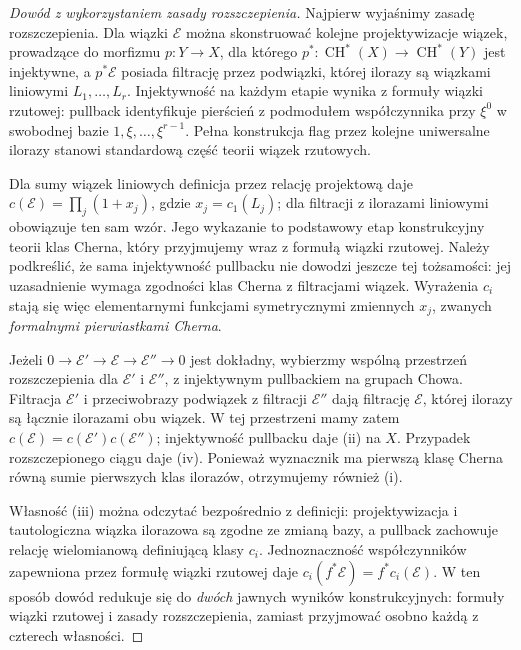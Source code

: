 \documentclass[11pt,a4paper,openany]{report}
\numberwithin{equation}{section}
\theoremstyle{plain}
\theoremstyle{definition}
\theoremstyle{remark}
\begin{document}
\begin{proof}[Dowód z wykorzystaniem zasady rozszczepienia]
Najpierw wyjaśnimy zasadę rozszczepienia. Dla wiązki
$\mathcal E$ można skonstruować kolejne projektywizacje
wiązek, prowadzące do morfizmu $p:Y\to X$, dla którego
$p^*:\operatorname{CH}^*(X)\to\operatorname{CH}^*(Y)$
jest injektywne, a $p^*\mathcal E$ posiada filtrację
przez podwiązki, której ilorazy są wiązkami liniowymi
$L_1,\ldots,L_r$. Injektywność na każdym etapie
wynika z formuły wiązki rzutowej: pullback
identyfikuje pierścień z podmodułem współczynnika
przy $\xi^0$ w swobodnej bazie $1,\xi,\ldots,\xi^{r-1}$.
Pełna konstrukcja flag przez kolejne uniwersalne ilorazy
stanowi standardową część teorii wiązek rzutowych.

Dla sumy wiązek liniowych definicja przez relację
projektową daje
$c(\mathcal E)=\prod_j(1+x_j)$,
gdzie $x_j=c_1(L_j)$; dla filtracji z ilorazami liniowymi
obowiązuje ten sam wzór. Jego wykazanie to podstawowy
etap konstrukcyjny teorii klas Cherna, który
przyjmujemy wraz z formułą wiązki rzutowej.
Należy podkreślić, że sama injektywność pullbacku
nie dowodzi jeszcze tej tożsamości: jej uzasadnienie
wymaga zgodności klas Cherna z filtracjami wiązek.
Wyrażenia $c_i$ stają się więc elementarnymi funkcjami
symetrycznymi zmiennych $x_j$, zwanych
\emph{formalnymi pierwiastkami Cherna}.

Jeżeli $0\to\mathcal E'\to\mathcal E\to\mathcal E''\to0$
jest dokładny, wybierzmy wspólną przestrzeń rozszczepienia
dla $\mathcal E'$ i $\mathcal E''$, z injektywnym
pullbackiem na grupach Chowa. Filtracja
$\mathcal E'$ i przeciwobrazy podwiązek z filtracji
$\mathcal E''$ dają filtrację $\mathcal E$,
której ilorazy są łącznie ilorazami obu wiązek.
W tej przestrzeni mamy zatem
$c(\mathcal E)=c(\mathcal E')c(\mathcal E'')$;
injektywność pullbacku daje (ii) na $X$.
Przypadek rozszczepionego ciągu daje (iv).
Ponieważ wyznacznik ma pierwszą klasę Cherna równą
sumie pierwszych klas ilorazów, otrzymujemy również (i).

Własność (iii) można odczytać bezpośrednio z definicji:
projektywizacja i tautologiczna wiązka ilorazowa
są zgodne ze zmianą bazy, a pullback zachowuje relację
wielomianową definiującą klasy $c_i$. Jednoznaczność
współczynników zapewniona przez formułę wiązki rzutowej
daje $c_i(f^*\mathcal E)=f^*c_i(\mathcal E)$.
W ten sposób dowód redukuje się do \emph{dwóch} jawnych
wyników konstrukcyjnych: formuły wiązki rzutowej
i zasady rozszczepienia, zamiast przyjmować osobno
każdą z czterech własności.
\end{proof}
\end{document}
